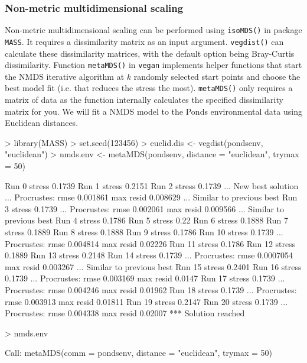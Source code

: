 \documentclass[a4paper,10pt]{article}
\newcommand{\vegan}{\texttt{vegan}\xspace}
\begin{document}
{\subsubsection{Non-metric multidimensional scaling}
Non-metric multidimensional scaling can be performed using \texttt{isoMDS()} in package \texttt{MASS}. It requires a dissimilarity matrix as an input argument. \texttt{vegdist()} can calculate these dissimilarity matrices, with the default option being Bray-Curtis dissimilarity. Function \texttt{metaMDS()} in \vegan implements helper functions that start the NMDS iterative algorithm at $k$ randomly selected start points and choose the best model fit (i.e. that reduces the stress the most). \texttt{metaMDS()} only requires a matrix of data as the function internally calculates the specified dissimilarity matrix for you. We will fit a NMDS model to the Ponds environmental data using Euclidean distances.

\begin{Schunk}
\begin{Sinput}
> library(MASS)
> set.seed(123456)
> euclid.dis <- vegdist(pondsenv, "euclidean")
> nmds.env <- metaMDS(pondsenv, distance = "euclidean", trymax = 50)
\end{Sinput}
\begin{Soutput}
Run 0 stress 0.1739 
Run 1 stress 0.2151 
Run 2 stress 0.1739 
... New best solution
... Procrustes: rmse 0.001861  max resid 0.008629 
... Similar to previous best
Run 3 stress 0.1739 
... Procrustes: rmse 0.002061  max resid 0.009566 
... Similar to previous best
Run 4 stress 0.1786 
Run 5 stress 0.22 
Run 6 stress 0.1888 
Run 7 stress 0.1889 
Run 8 stress 0.1888 
Run 9 stress 0.1786 
Run 10 stress 0.1739 
... Procrustes: rmse 0.004814  max resid 0.02226 
Run 11 stress 0.1786 
Run 12 stress 0.1889 
Run 13 stress 0.2148 
Run 14 stress 0.1739 
... Procrustes: rmse 0.0007054  max resid 0.003267 
... Similar to previous best
Run 15 stress 0.2401 
Run 16 stress 0.1739 
... Procrustes: rmse 0.003169  max resid 0.0147 
Run 17 stress 0.1739 
... Procrustes: rmse 0.004246  max resid 0.01962 
Run 18 stress 0.1739 
... Procrustes: rmse 0.003913  max resid 0.01811 
Run 19 stress 0.2147 
Run 20 stress 0.1739 
... Procrustes: rmse 0.004338  max resid 0.02007 
*** Solution reached
\end{Soutput}
\begin{Sinput}
> nmds.env
\end{Sinput}
\begin{Soutput}
Call:
metaMDS(comm = pondsenv, distance = "euclidean", trymax = 50) 


\end{Soutput}
\end{Schunk}}
\end{document}
